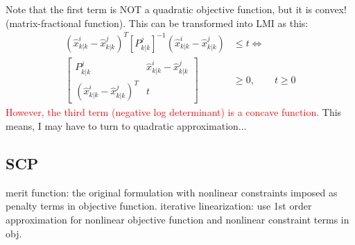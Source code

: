 \documentclass[letterpaper, 10 pt, conference]{ieeeconf}  %
\begin{document}
Note that the first term is NOT a quadratic objective function, but it is convex! (matrix-fractional function).
This can be transformed into LMI as this:
\begin{align*}
(\hat{x}^i_{k|k}-\hat{x}^j_{k|k})^T[P^j_{k|k}]^{-1}(\hat{x}^i_{k|k}-\hat{x}^j_{k|k})&\leq t \iff\\
\begin{bmatrix}
P^j_{k|k} & \hat{x}^i_{k|k}-\hat{x}^j_{k|k}\\
(\hat{x}^i_{k|k}-\hat{x}^j_{k|k})^T & t
\end{bmatrix}&\geq 0,\qquad t\geq 0
\end{align*}
\textcolor{red}{However, the third term (negative log determinant) is a concave function.}
This means, I may have to turn to quadratic approximation...

\subsection{SCP}
merit function: the original formulation with nonlinear constraints imposed as penalty terms in objective function.
iterative linearization: use 1st order approximation for nonlinear objective function and nonlinear constraint terms in obj.
\end{document}
